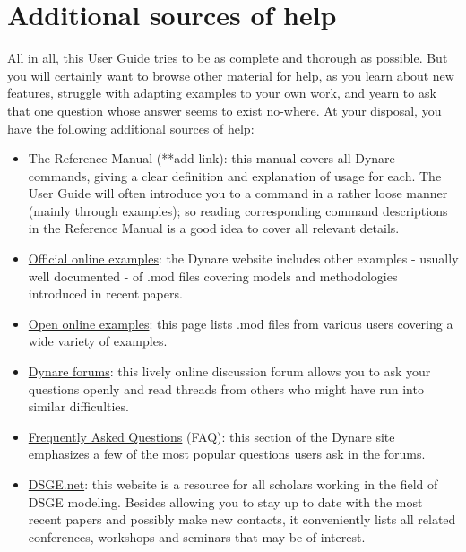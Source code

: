 \section{Additional sources of help}
All in all, this User Guide tries to be as complete and thorough as possible. But you will certainly want to browse other material for help, as you learn about new features, struggle with adapting examples to your own work, and yearn to ask that one question whose answer seems to exist no-where. At your disposal, you have the following additional sources of help:
\begin{itemize}
\item The Reference Manual (**add link): this manual covers all Dynare commands, giving a clear definition and explanation of usage for each. The User Guide will often introduce you to a command in a rather loose manner (mainly through examples); so reading corresponding command descriptions in the Reference Manual is a good idea to cover all relevant details. 
\item \href{http://www.cepremap.cnrs.fr/juillard/mambo/index.php?option=com_content&task=category&sectionid=11&id=96&Itemid=89}{Official online examples}: the Dynare website includes other examples - usually well documented - of .mod files covering models and methodologies introduced in recent papers. 
\item \href{http://www.cepremap.cnrs.fr/juillard/mambo/index.php?option=com_forum&Itemid=95&page=viewforum&f=2&sid=10290a11eb7a48243971159f5b86f83e}{Open online examples}: this page lists .mod files from various users covering a wide variety of examples. 
\item \href{http://www.cepremap.cnrs.fr/juillard/mambo/index.php?option=com_forum&Itemid=95&page=viewforum&f=1}{Dynare forums}: this lively online discussion forum allows you to ask your questions openly and read threads from others who might have run into similar difficulties. 
\item \href{http://www.cepremap.cnrs.fr/juillard/mambo/index.php?option=com_content&task=section&id=3&Itemid=40}{Frequently Asked Questions} (FAQ): this section of the Dynare site emphasizes a few of the most popular questions users ask in the forums. 
\item \href{http://www.dsge.net}{DSGE.net}: this website is a resource for all scholars working in the field of DSGE modeling. Besides allowing you to stay up to date with the most recent papers and possibly make new contacts, it conveniently lists all related conferences, workshops and seminars that may be of interest. 
\end{itemize}

